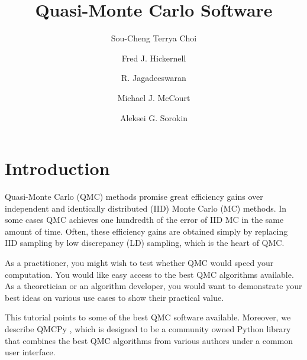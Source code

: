 \documentclass[graybox,footinfo]{svmult}
\begin{document}
\title*{Quasi-Monte Carlo Software}
\author{Sou-Cheng Terrya Choi \and Fred J. Hickernell \and R. Jagadeeswaran \and Michael J. McCourt \and Aleksei G. Sorokin}

\maketitle



\section{Introduction} \label{sec:intro}
Quasi-Monte Carlo (QMC) methods promise great efficiency gains over independent and identically distributed (IID) Monte Carlo (MC) methods.  In some cases QMC  achieves one hundredth of the error of IID MC in the same amount of time. Often, these efficiency gains are obtained simply by  replacing IID sampling by low discrepancy (LD) sampling, which is the heart of QMC. 

As a practitioner, you might wish to test whether QMC would speed your computation.  You would like easy access to the best QMC algorithms available.  As a theoretician or an algorithm developer, you would want to demonstrate your best ideas on  various  use cases to show their practical value.  

This tutorial points to some of the best QMC software available.  Moreover, we describe QMCPy \cite{QMCPy2020a}, which is designed to be a community owned Python library that combines the best QMC algorithms from various authors under a common user interface.
\end{document}
